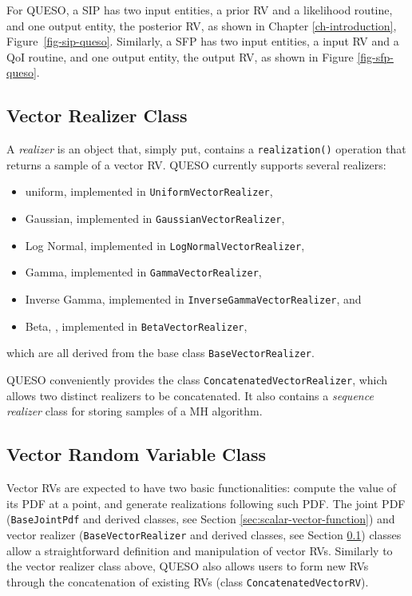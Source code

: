 For QUESO, a SIP has two input entities, a prior RV and
a likelihood routine, and one output entity, the posterior RV, as shown in Chapter \ref{ch-introduction}, Figure~\ref{fig-sip-queso}.
%
Similarly, a SFP has two input entities, a input RV and
a QoI routine, and one output entity, the output RV, as shown in Figure \ref{fig-sfp-queso}.


\subsection{Vector Realizer Class}\label{sec:vector-realizer-class}
%
A {\it realizer} is an object that, simply put, contains a \verb+realization()+ operation that returns a sample of a vector RV.
QUESO currently supports several realizers: 
\begin{itemize}
 \item uniform, implemented in \verb+UniformVectorRealizer+,                \vspace{-8pt}
\item Gaussian, implemented in \verb+GaussianVectorRealizer+,               \vspace{-8pt}
\item Log Normal, implemented in \verb+LogNormalVectorRealizer+,            \vspace{-8pt}
\item Gamma,  implemented in \verb+GammaVectorRealizer+,                    \vspace{-8pt}
\item Inverse Gamma, implemented in \verb+InverseGammaVectorRealizer+, and  \vspace{-8pt}
\item Beta, , implemented in \verb+BetaVectorRealizer+,                     \vspace{-8pt}
\end{itemize}
which are all derived from the base class \verb+BaseVectorRealizer+. 
 
QUESO conveniently provides the class \verb+ConcatenatedVectorRealizer+, which allows two distinct realizers to be concatenated.
It also contains a {\it sequence realizer} class for storing samples of a MH algorithm. 




\subsection{Vector Random Variable Class}
%
Vector RVs are expected to have two basic functionalities:
compute the value of its PDF at a point, and generate realizations following such PDF.
The joint PDF (\verb+BaseJointPdf+ and derived classes, see Section \ref{sec:scalar-vector-function}) and vector realizer  (\verb+BaseVectorRealizer+ and derived classes, see Section \ref{sec:vector-realizer-class}) classes allow a straightforward definition and manipulation of vector RVs. Similarly to the vector realizer class above, QUESO also allows users to form new RVs through the concatenation of existing RVs (class \verb+ConcatenatedVectorRV+).

